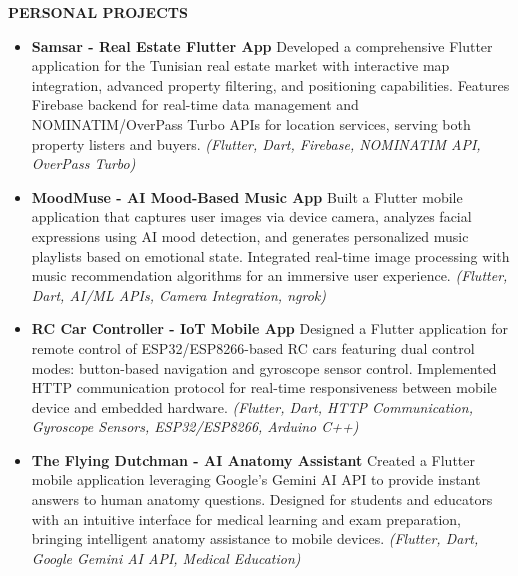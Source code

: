 \documentclass[10pt,a4paper]{article}
\newcommand{\cvsection}[1]{%
  \vspace{1em}%
  {\centering\textcolor{sectcol}{\textbf{#1}}\par}%
  \vspace{0.2em}%
}
\begin{document}
\vspace{-6px}
\cvsection{PERSONAL PROJECTS}
\vspace{-3px}
\begin{itemize}[noitemsep, topsep=0pt, left=3pt]
 \item {\href{https://github.com/chater-marzougui/Samsar}{\color{bgcol}} \textbf{Samsar - Real Estate Flutter App}
Developed a comprehensive Flutter application for the Tunisian real estate market with interactive map integration, advanced property filtering, and positioning capabilities. Features Firebase backend for real-time data management and NOMINATIM/OverPass Turbo APIs for location services, serving both property listers and buyers.
\textit{(Flutter, Dart, Firebase, NOMINATIM API, OverPass Turbo)}}
\vspace{5px}

\item {\href{https://github.com/chater-marzougui/MoodMuse}{\color{bgcol}} \textbf{MoodMuse - AI Mood-Based Music App}
Built a Flutter mobile application that captures user images via device camera, analyzes facial expressions using AI mood detection, and generates personalized music playlists based on emotional state. Integrated real-time image processing with music recommendation algorithms for an immersive user experience.
\textit{(Flutter, Dart, AI/ML APIs, Camera Integration, ngrok)}}
\vspace{5px}

\item {\href{https://github.com/chater-marzougui/Flutter-Car-Control_Http}{\color{bgcol}} \textbf{RC Car Controller - IoT Mobile App}
Designed a Flutter application for remote control of ESP32/ESP8266-based RC cars featuring dual control modes: button-based navigation and gyroscope sensor control. Implemented HTTP communication protocol for real-time responsiveness between mobile device and embedded hardware.
\textit{(Flutter, Dart, HTTP Communication, Gyroscope Sensors, ESP32/ESP8266, Arduino C++)}}
\vspace{5px}

\item {\href{https://github.com/chater-marzougui/AI-Anatomy}{\color{bgcol}} \textbf{The Flying Dutchman - AI Anatomy Assistant}
Created a Flutter mobile application leveraging Google's Gemini AI API to provide instant answers to human anatomy questions. Designed for students and educators with an intuitive interface for medical learning and exam preparation, bringing intelligent anatomy assistance to mobile devices.
\textit{(Flutter, Dart, Google Gemini AI API, Medical Education)}}

\end{itemize}
\end{document}
